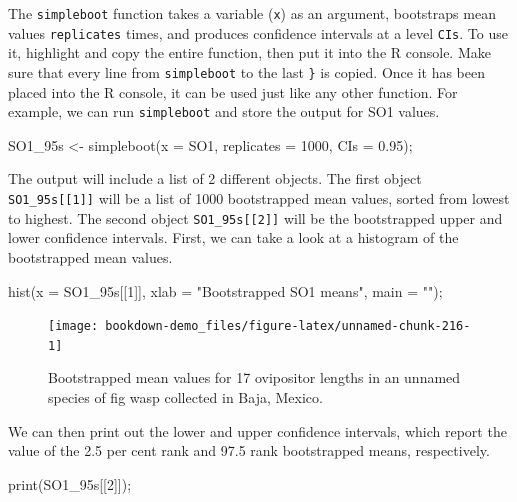 \documentclass[
]{scrbook}
\newenvironment{Shaded}{\begin{snugshade}}{\end{snugshade}}
\newcommand{\AttributeTok}[1]{\textcolor[rgb]{0.77,0.63,0.00}{#1}}
\newcommand{\DecValTok}[1]{\textcolor[rgb]{0.00,0.00,0.81}{#1}}
\newcommand{\FloatTok}[1]{\textcolor[rgb]{0.00,0.00,0.81}{#1}}
\newcommand{\FunctionTok}[1]{\textcolor[rgb]{0.00,0.00,0.00}{#1}}
\newcommand{\NormalTok}[1]{#1}
\newcommand{\OtherTok}[1]{\textcolor[rgb]{0.56,0.35,0.01}{#1}}
\newcommand{\StringTok}[1]{\textcolor[rgb]{0.31,0.60,0.02}{#1}}
\begin{document}
The \texttt{simpleboot} function takes a variable (\texttt{x}) as an argument, bootstraps mean values \texttt{replicates} times, and produces confidence intervals at a level \texttt{CIs}.
To use it, highlight and copy the entire function, then put it into the R console.
Make sure that every line from \texttt{simpleboot} to the last \texttt{\}} is copied.
Once it has been placed into the R console, it can be used just like any other function.
For example, we can run \texttt{simpleboot} and store the output for SO1 values.

\begin{Shaded}
\begin{Highlighting}[]
\NormalTok{SO1\_95s }\OtherTok{\textless{}{-}} \FunctionTok{simpleboot}\NormalTok{(}\AttributeTok{x =}\NormalTok{ SO1, }\AttributeTok{replicates =} \DecValTok{1000}\NormalTok{, }\AttributeTok{CIs =} \FloatTok{0.95}\NormalTok{);}
\end{Highlighting}
\end{Shaded}

The output will include a list of 2 different objects.
The first object \texttt{SO1\_95s{[}{[}1{]}{]}} will be a list of 1000 bootstrapped mean values, sorted from lowest to highest.
The second object \texttt{SO1\_95s{[}{[}2{]}{]}} will be the bootstrapped upper and lower confidence intervals.
First, we can take a look at a histogram of the bootstrapped mean values.

\begin{Shaded}
\begin{Highlighting}[]
\FunctionTok{hist}\NormalTok{(}\AttributeTok{x =}\NormalTok{ SO1\_95s[[}\DecValTok{1}\NormalTok{]], }\AttributeTok{xlab =} \StringTok{"Bootstrapped SO1 means"}\NormalTok{, }\AttributeTok{main =} \StringTok{""}\NormalTok{);}
\end{Highlighting}
\end{Shaded}

\begin{figure}
\texttt{[image: bookdown-demo\_files/figure-latex/unnamed-chunk-216-1]} \caption{Bootstrapped mean values for 17 ovipositor lengths in an unnamed species of fig wasp collected in Baja, Mexico.}\label{fig:unnamed-chunk-216}
\end{figure}

We can then print out the lower and upper confidence intervals, which report the value of the 2.5 per cent rank and 97.5 rank bootstrapped means, respectively.

\begin{Shaded}
\begin{Highlighting}[]
\FunctionTok{print}\NormalTok{(SO1\_95s[[}\DecValTok{2}\NormalTok{]]);}
\end{Highlighting}
\end{Shaded}
\end{document}
